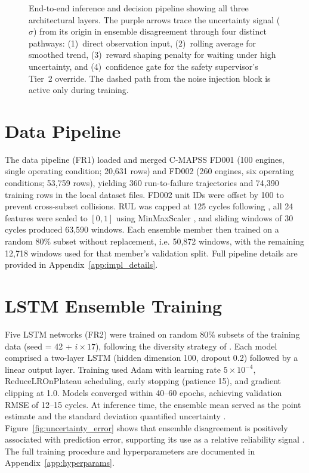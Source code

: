 \documentclass[12pt,a4paper]{report}
\begin{document}
\begin{figure}[htbp]
{\begin{tikzpicture}
\end{tikzpicture}%
}%
\caption{End-to-end inference and decision pipeline showing all three architectural layers. The purple arrows trace the uncertainty signal ($\sigma$) from its origin in ensemble disagreement through four distinct pathways: (1)~direct observation input, (2)~rolling average for smoothed trend, (3)~reward shaping penalty for waiting under high uncertainty, and (4)~confidence gate for the safety supervisor's Tier~2 override. The dashed path from the noise injection block is active only during training.}
\label{fig:component_diagram}
\end{figure}

\section{Data Pipeline}

The data pipeline (FR1) loaded and merged C-MAPSS FD001 (100 engines, single operating condition; 20,631 rows) and FD002 (260 engines, six operating conditions; 53,759 rows), yielding 360 run-to-failure trajectories and 74,390 training rows in the local dataset files. FD002 unit IDs were offset by 100 to prevent cross-subset collisions. RUL was capped at 125 cycles following \citet{heimes2008recurrent}, all 24 features were scaled to $[0, 1]$ using MinMaxScaler \citep{pedregosa2011scikit}, and sliding windows of 30 cycles produced 63,590 windows. Each ensemble member then trained on a random 80\% subset without replacement, i.e. 50,872 windows, with the remaining 12,718 windows used for that member's validation split. Full pipeline details are provided in Appendix~\ref{app:impl_details}.

\section{LSTM Ensemble Training}

Five LSTM networks (FR2) were trained on random 80\% subsets of the training data (seed = 42 + $i \times 17$), following the diversity strategy of \citet{fort2019deep}. Each model comprised a two-layer LSTM (hidden dimension 100, dropout 0.2) followed by a linear output layer. Training used Adam \citep{kingma2014adam} with learning rate $5 \times 10^{-4}$, ReduceLROnPlateau scheduling, early stopping (patience 15), and gradient clipping at 1.0. Models converged within 40--60 epochs, achieving validation RMSE of 12--15 cycles. At inference time, the ensemble mean served as the point estimate and the standard deviation quantified uncertainty \citep{lakshminarayanan2017simple}. Figure~\ref{fig:uncertainty_error} shows that ensemble disagreement is positively associated with prediction error, supporting its use as a relative reliability signal \citep{ovadia2019can}. The full training procedure and hyperparameters are documented in Appendix~\ref{app:hyperparams}.
\end{document}
